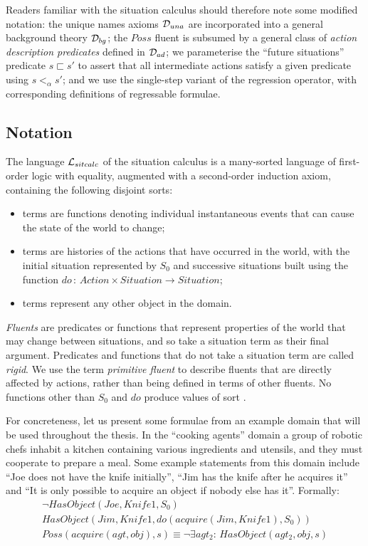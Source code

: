 Readers familiar with the situation calculus should therefore note
some modified notation: the unique names axioms $\mathcal{D}_{una}$ are incorporated
into a general background theory $\mathcal{D}_{bg}$; the $Poss$ fluent is
subsumed by a general class of \emph{action description predicates}
defined in $\mathcal{D}_{ad}$; we parameterise the {}``future situations''
predicate $s\sqsubset s'$ to assert that all intermediate actions
satisfy a given predicate using $s<_{\alpha}s'$; and
we use the single-step variant of the regression operator, with corresponding
definitions of regressable formulae.


\subsection{Notation\label{sec:Background:SC:Notation}}

The language $\mathcal{L}_{sitcalc}$ of the situation calculus is a many-sorted language
of first-order logic with equality, augmented with a second-order
induction axiom, containing the following disjoint sorts:

\begin{itemize}
\item \emph{} terms are functions denoting individual instantaneous
events that can cause the state of the world to change; 
\item {} terms are histories of the actions that have occurred
in the world, with the initial situation represented by $S_{0}$ and
successive situations built using the function $do\,:\, Action\times Situation\rightarrow Situation$; 
\item {} terms represent any other object in the domain. 
\end{itemize}
\emph{Fluents} are predicates or functions that represent properties
of the world that may change between situations, and so take a situation
term as their final argument. Predicates and functions that do not
take a situation term are called \emph{rigid}. We use the term \emph{primitive
fluent} to describe fluents that are directly affected by actions,
rather than being defined in terms of other fluents. No functions
other than $S_{0}$ and $do$ produce values of sort .

For concreteness, let us present some formulae from an example domain
that will be used throughout the thesis. In the {}``cooking agents''
domain a group of robotic chefs inhabit a kitchen containing various
ingredients and utensils, and they must cooperate to prepare a meal.
Some example statements from this domain include {}``Joe does not
have the knife initially'', {}``Jim has the knife after he acquires
it'' and {}``It is only possible to acquire an object if nobody
else has it''. Formally:\begin{gather*}
\neg HasObject(Joe,Knife1,S_{0})\\
HasObject(Jim,Knife1,do(acquire(Jim,Knife1),S_{0}))\\
Poss(acquire(agt,obj),s)\equiv\neg\exists agt_{2}:\, HasObject(agt_{2},obj,s)\end{gather*}



